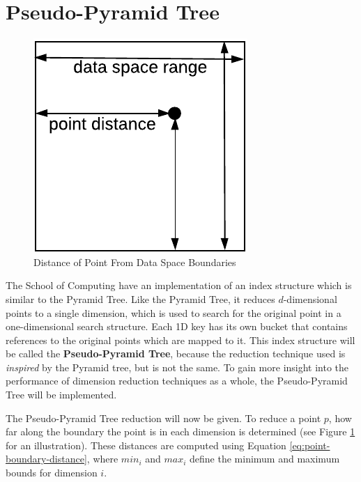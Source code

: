 \section{Pseudo-Pyramid Tree}

\begin{figure}
	\vspace{-5pt}
	\begin{center}
		\includegraphics[scale=0.7]{figures/pseudo-pyramid_tree_point_boundary_distances.pdf}
	\end{center}
	\vspace{-15pt}
	\caption{Distance of Point From Data Space Boundaries}
	\label{fig:point-boundary-distance}
\end{figure}

The School of Computing have an implementation of an index structure which is similar to the Pyramid Tree. Like the Pyramid Tree, it reduces $d$-dimensional points to a single dimension, which is used to search for the original point in a one-dimensional search structure. Each 1D key has its own bucket that contains references to the original points which are mapped to it. This index structure will be called the \textbf{Pseudo-Pyramid Tree}, because the reduction technique used is \textit{inspired} by the Pyramid tree, but is not the same.  To gain more insight into the performance of dimension reduction techniques as a whole, the Pseudo-Pyramid Tree will be implemented.

The Pseudo-Pyramid Tree reduction will now be given. To reduce a point $p$, how far along the boundary the point is in each dimension is determined (see Figure \ref{fig:point-boundary-distance} for an illustration). These distances are computed using Equation \ref{eq:point-boundary-distance}, where  $min_i$ and $max_i$ define the minimum and maximum bounds for dimension $i$.

